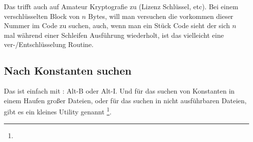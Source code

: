 Das trifft auch auf Amateur Kryptografie zu (Lizenz Schl\"ussel, etc). 
Bei einem verschl\"usselten Block von $n$ Bytes, will man versuchen die vorkommen dieser Nummer im Code zu suchen,
auch, wenn man ein St\"uck Code sieht der sich $n$ mal w\"ahrend einer Schleifen Ausf\"uhrung wiederholt, ist das vielleicht
eine ver-/Entschl\"usselung Routine.

\subsection{Nach Konstanten suchen}

Das ist einfach mit \IDA: Alt-B oder Alt-I.
Und f\"ur das suchen von Konstanten in einem Haufen großer Dateien, oder f\"ur das suchen in nicht ausf\"uhrbaren Dateien,
gibt es ein kleines Utility genannt \footnote{\BGREPURL}.
